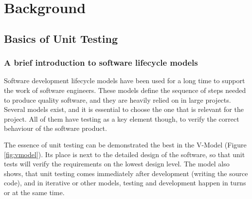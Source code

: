 \chapter{Background}
\section{Basics of Unit Testing}

\subsection{A brief introduction to software lifecycle models}
Software development lifecycle models have been used for a long time to support the work of software engineers. These models define the sequence of steps needed to produce quality software, and they are heavily relied on in large projects. Several models exist, and it is essential to choose the one that is relevant for the project. All of them have testing as a key element though, to verify the correct behaviour of the software product. 

The essence of unit testing can be demonstrated the best in the V-Model (Figure \ref{fig:vmodel}). Its place is next to the detailed design of the software, so that unit tests will verify the requirements on the lowest design level. The model also shows, that unit testing comes immediately after development (writing the source code), and in iterative or other models, testing and development happen in turns or at the same time. \cite{Ruparelia:2010:SDL:1764810.1764814} 




